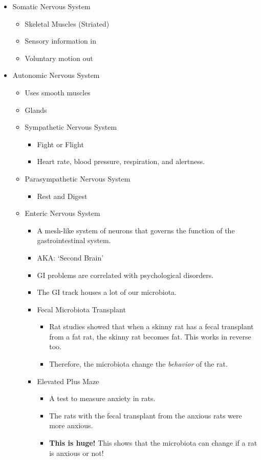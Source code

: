 \begin{itemize}
    \item Somatic Nervous System
    \begin{itemize}
        \item Skeletal Muscles (Striated)
        \item Sensory information in
        \item Voluntary motion out
    \end{itemize}
    \item Autonomic Nervous System
    \begin{itemize}
        \item Uses smooth muscles
        \item Glands
        \item Sympathetic Nervous System
        \begin{itemize}
            \item Fight or Flight
            \item Heart rate, blood pressure, respiration, and alertness.
        \end{itemize}
        \item Parasympathetic Nervous System
        \begin{itemize}
            \item Rest and Digest
        \end{itemize}
        \item Enteric Nervous System
        \begin{itemize}
            \item A mesh-like system of neurons that governs the function of the gastrointestinal system.
            \item AKA: `Second Brain'
            \item GI problems are correlated with psychological disorders.
            \item The GI track houses a lot of our microbiota.
            \item Fecal Microbiota Transplant
            \begin{itemize}
                \item Rat studies showed that when a skinny rat has a fecal transplant from a fat rat, the skinny rat becomes fat. This works in reverse too.
                \item Therefore, the microbiota change the \textit{behavior} of the rat.
            \end{itemize}
            \item Elevated Plus Maze
            \begin{itemize}
                \item A test to measure anxiety in rats.
                \item The rats with the fecal transplant from the anxious rats were more anxious. 
                \item \textbf{This is huge!} This shows that the microbiota can change if a rat is anxious or not!
            \end{itemize}
        \end{itemize}
    \end{itemize}
\end{itemize}